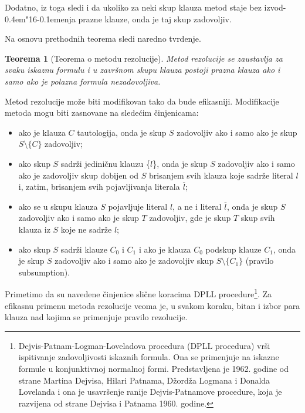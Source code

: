 \documentclass[12pt, a4paper, titlepage, twoside]{article}
\newtheorem{theorem}{Teorema}[section]
\theoremstyle{definition}
\def\dj{d\kern-0.4em\char"16\kern-0.1em}
\begin{document}
Dodatno, iz toga sledi i da ukoliko za neki skup klauza
metod staje bez izvo\dj{}enja prazne klauze, onda je taj skup zadovoljiv.

\noindent
Na osnovu prethodnih teorema sledi naredno tvrdenje.

\vspace{0.2cm}
\begin{theorem}[Teorema o metodu rezolucije]
Metod rezolucije se zaustavlja za svaku iskaznu formulu i u zavr\v snom skupu klauza 
postoji prazna klauza ako i samo ako je polazna formula nezadovoljiva.
\end{theorem}

\newpage
Metod rezolucije mo\v ze biti modifikovan tako da bude efikasniji. Modifikacije
metoda mogu biti zasnovane na slede\'cim \v cinjenicama: 
\begin{itemize}
	\item ako je klauza $C$ tautologija, onda je skup $S$ zadovoljiv ako i samo ako je
skup $S \setminus \{C\}$ zadovoljiv;
	\item ako skup $S$ sadr\v zi jedini\v cnu klauzu \{$l$\}, onda je skup $S$ zadovoljiv ako
i samo ako je zadovoljiv skup dobijen od $S$ brisanjem svih klauza koje
sadr\v ze literal $l$ i, zatim, brisanjem svih pojavljivanja literala $\overline{l}$;
	\item ako se u skupu klauza $S$ pojavljuje literal $l$, a ne i literal $\overline{l}$, 
onda je skup $S$ zadovoljiv ako i samo ako je skup $T$ zadovoljiv, gde je skup $T$ skup svih
klauza iz $S$ koje ne sadr\v ze $l$;
	\item ako skup $S$ sadr\v zi klauze $C_0$ i $C_1$ i ako je klauza $C_0$ podskup klauze $C_1$,
onda je skup $S$ zadovoljiv ako i samo ako je zadovoljiv skup $S \setminus \{C_1\}$ (pravilo
subsumption).
\end{itemize}


Primetimo da su navedene \v cinjenice sli\v cne koracima {DPLL procedure\footnote
{Dejvis-Patnam-Logman-Loveladova procedura (DPLL procedura) vr\v si ispitivanje zadovoljivosti 
iskaznih formula. Ona se primenjuje na iskazne formule u konjunktivnoj normalnoj formi. 
Predstavljena je 1962. godine od strane Martina Dejvisa, Hilari Patnama, D\v zord\v za 
Logmana i Donalda Lovelanda i ona je usavr\v senje ranije Dejvis-Patnamove procedure, koja je 
razvijena od strane Dejvisa i Patnama 1960. godine.}}.
Za efikasnu primenu metoda rezolucije veoma je, u svakom koraku, bitan i
izbor para klauza nad kojima se primenjuje pravilo rezolucije.

\newpage
\end{document}
